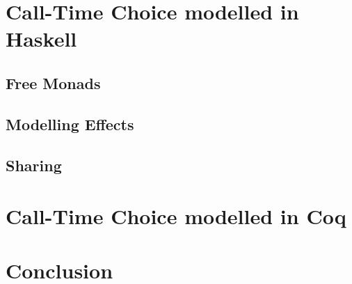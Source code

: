 \documentclass[a4paper, 11pt, fleqn, twoside]{scrreprt}
\begin{document}
\chapter{Call-Time Choice modelled in Haskell}

\section{Free Monads}

\section{Modelling Effects}

\section{Sharing}

\chapter{Call-Time Choice modelled in Coq}

\chapter{Conclusion}



\appendix
\end{document}
